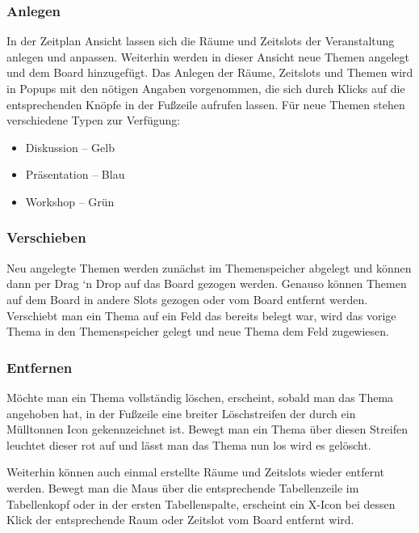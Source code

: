 \subsubsection*{Anlegen}
In der Zeitplan Ansicht lassen sich die Räume und Zeitslots der Veranstaltung
anlegen und anpassen. Weiterhin werden in dieser Ansicht neue Themen angelegt
und dem Board hinzugefügt. Das Anlegen der Räume, Zeitslots und Themen wird in
Popups mit den nötigen Angaben vorgenommen, die sich durch Klicks auf die
entsprechenden Knöpfe in der Fußzeile aufrufen lassen. Für neue Themen stehen
verschiedene Typen zur Verfügung:
\begin{itemize}
\item Diskussion -- Gelb
\item Präsentation -- Blau
\item Workshop -- Grün
\end{itemize}

\subsubsection*{Verschieben}
Neu angelegte Themen werden zunächst im Themenspeicher abgelegt und können dann
per Drag `n Drop auf das Board gezogen werden. Genauso können Themen auf dem
Board in andere Slots gezogen oder vom Board entfernt werden. Verschiebt man ein
Thema auf ein Feld das bereits belegt war, wird das vorige Thema in den
Themenspeicher gelegt und neue Thema dem Feld zugewiesen.

\subsubsection*{Entfernen}
Möchte man ein Thema vollständig löschen, erscheint, sobald man das Thema
angehoben hat, in der Fußzeile eine breiter Löschstreifen der durch ein
Mülltonnen Icon gekennzeichnet ist. Bewegt man ein Thema über diesen Streifen
leuchtet dieser rot auf und lässt man das Thema nun los wird es gelöscht.

Weiterhin können auch einmal erstellte Räume und Zeitslots wieder entfernt
werden. Bewegt man die Maus über die entsprechende Tabellenzeile im Tabellenkopf
oder in der ersten Tabellenspalte, erscheint ein X-Icon bei dessen Klick der
entsprechende Raum oder Zeitslot vom Board entfernt wird.
